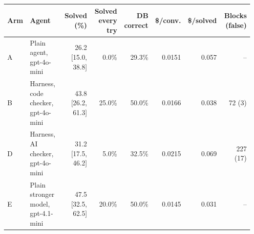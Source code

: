 \begin{tabular}{llrrrrrr}
\toprule
Arm & Agent & Solved (\%) & Solved every try & DB correct & \$/conv. & \$/solved & Blocks (false) \\
\midrule
A & Plain agent, gpt-4o-mini & 26.2 {\scriptsize[15.0, 38.8]} & 0.0\% & 29.3\% & 0.0151 & 0.057 & -- \\
B & Harness, code checker, gpt-4o-mini & 43.8 {\scriptsize[26.2, 61.3]} & 25.0\% & 50.0\% & 0.0166 & 0.038 & 72 (3) \\
D & Harness, AI checker, gpt-4o-mini & 31.2 {\scriptsize[17.5, 46.2]} & 5.0\% & 32.5\% & 0.0215 & 0.069 & 227 (17) \\
E & Plain stronger model, gpt-4.1-mini & 47.5 {\scriptsize[32.5, 62.5]} & 20.0\% & 50.0\% & 0.0145 & 0.031 & -- \\
\bottomrule
\end{tabular}
